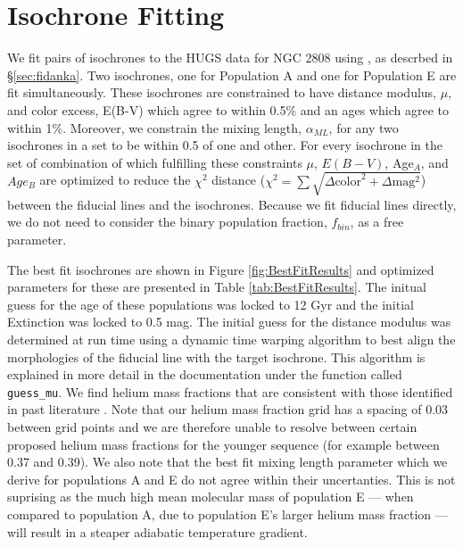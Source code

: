 \section{Isochrone Fitting}\label{sec:isoFit}
We fit pairs of isochrones to the HUGS data for NGC 2808 using \fidanka, as
descrbed in \S \ref{sec:fidanka}. Two isochrones, one for Population A and one
for Population E are fit simultaneously. These isochrones are constrained to
have distance modulus, $\mu$, and color excess, E(B-V) which agree to within
0.5\% and an ages which agree to within 1\%. Moreover, we constrain the mixing length, $\alpha_{ML}$, for any two
isochrones in a set to be within 0.5 of one and other. For every isochrone in
the set of combination of which fulfilling these constraints $\mu$, $E(B-V)$,
Age$_{A}$, and $Age_{B}$ are optimized to reduce the $\chi^{2}$ distance
($\chi^{2} = \sum\sqrt{\Delta \text{color}^{2} + \Delta \text{mag} ^{2}}$)
between the fiducial lines and the isochrones. Because we fit fiducial lines
directly, we do not need to consider the binary population fraction, $f_{bin}$,
as a free parameter.

The best fit isochrones are shown in Figure \ref{fig:BestFitResults} and
optimized parameters for these are presented in Table \ref{tab:BestFitResults}.
The initual guess for the age of these populations was locked to 12 Gyr
and the initial Extinction was locked to 0.5 mag. The initial guess for the
distance modulus was determined at run time using a dynamic time warping
algorithm to best align the morphologies of the fiducial line with the target
isochrone. This algorithm is explained in more detail in the \fidanka
documentation under the function called \texttt{guess\_mu}. We find helium mass
fractions that are consistent with those identified in past literature
\citep[e.g.][]{Milone2015}. Note that our helium mass fraction grid has a
spacing of 0.03 between grid points and we are therefore unable to resolve
between certain proposed helium mass fractions for the younger sequence (for
example between 0.37 and 0.39). We also note that the best fit mixing
length parameter which we derive for populations A and E do not agree within
their uncertanties. This is not suprising as the much high mean molecular mass
of population E --- when compared to population A, due to population E's larger
helium mass fraction --- will result in a steaper adiabatic temperature
gradient.

